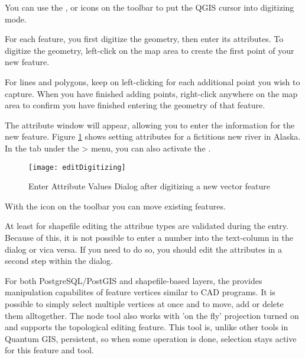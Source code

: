 
You can use the ,
 or
 icons on the toolbar to
put the QGIS cursor into digitizing mode.  

For each feature, you first digitize the geometry, then enter its attributes.
To digitize the geometry, left-click on the map area to create the first
point of your new feature.

For lines and polygons, keep on left-clicking for each additional
point you wish to capture.  When you have finished adding points,
right-click anywhere on the map area to confirm you have finished entering
the geometry of that feature.

The attribute window will appear, allowing you to enter the information for
the new feature. Figure \ref{fig:vector_digitising} shows setting attributes
for a fictitious new river in Alaska. In the  tab under the
 > menu, you can also activate the 
.

\begin{figure}[ht]
   \begin{center}
   \caption{Enter Attribute Values Dialog after digitizing a new vector
   feature \nixcaption}\label{fig:vector_digitising}\smallskip
   \texttt{[image: editDigitizing]}
\end{center}  
\end{figure}

With the  icon on the toolbar
you can move existing features.

\begin{Tip}[ht]\caption{\textsc{Attribute Value Types}}
At least for shapefile editing the attribue types are validated during the
entry. Because of this, it is not possible to enter a number into the text-column in
the dialog  or vica versa. If you need to do so,
you should edit the attributes in a second step within the  dialog.
\end{Tip}


For both PostgreSQL/PostGIS and shapefile-based layers, the 
 provides manipulation capabilites
of feature vertices similar to CAD programs. It is possible to simply select
multiple vertices at once and to move, add or delete them alltogether. The node
tool also works with 'on the fly' projection turned on and supports
the topological editing feature. This tool is, unlike other tools in Quantum GIS,
persistent, so when some operation is done, selection stays active for this
feature and tool.

